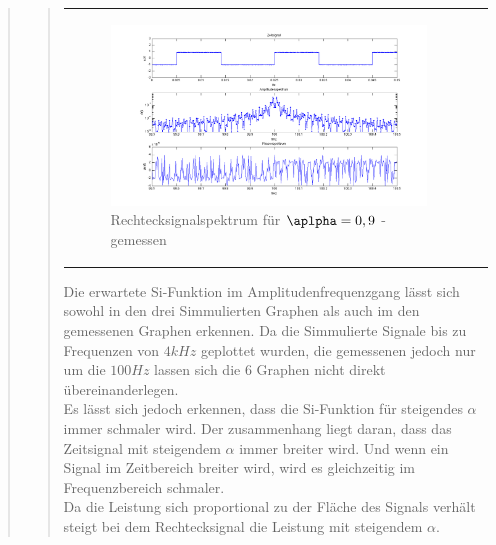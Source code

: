 \begin{quote}
\begin{quote}
\begin{center}
\begin{tabular}{ll}
\begin{minipage}{0.6\textwidth}
                   \begin{figure}[H]
                        \label{fig:}
                        \includegraphics[scale=0.3]{./Bilder/recht_alpha9_-_gemessen.png} %
                        \caption{Rechtecksignalspektrum für $\aplpha = 0,9$ - gemessen}
                    \end{figure}
                 \vspace{-1.5em}

                \end{minipage}

            \end{tabular}
            \end{center}

                        
            Die erwartete Si-Funktion im Amplitudenfrequenzgang lässt sich sowohl in den drei Simmulierten Graphen als
            auch im den gemessenen Graphen erkennen. Da die Simmulierte Signale bis zu Frequenzen von $4 kHz$ geplottet
            wurden, die gemessenen jedoch nur um die $100 Hz$ lassen sich die 6 Graphen nicht direkt
            übereinanderlegen.\\
            Es lässt sich jedoch erkennen, dass die Si-Funktion für steigendes $\alpha$ immer schmaler wird. Der
            zusammenhang liegt daran, dass das Zeitsignal mit steigendem $\alpha$ immer breiter wird. Und wenn ein
            Signal im Zeitbereich breiter wird, wird es gleichzeitig im Frequenzbereich schmaler.\\
            
            Da die Leistung sich proportional zu der Fläche des Signals verhält steigt bei dem Rechtecksignal die
            Leistung mit steigendem $\alpha$.
                     

\end{quote}
\end{quote}
